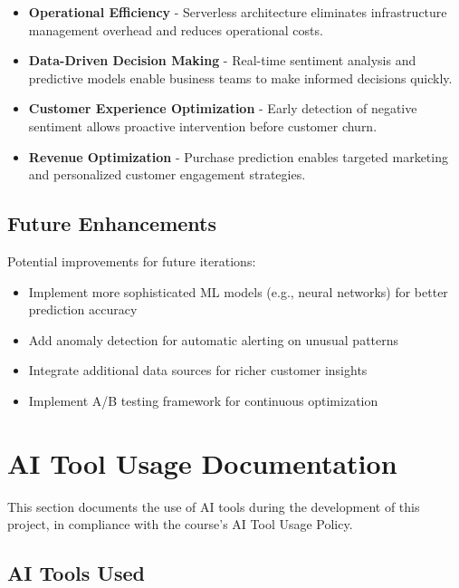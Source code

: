 \documentclass[12pt,a4paper]{article}
\begin{document}
\begin{itemize}
    \item \textbf{Operational Efficiency} - Serverless architecture eliminates infrastructure management overhead and reduces operational costs.
    
    \item \textbf{Data-Driven Decision Making} - Real-time sentiment analysis and predictive models enable business teams to make informed decisions quickly.
    
    \item \textbf{Customer Experience Optimization} - Early detection of negative sentiment allows proactive intervention before customer churn.
    
    \item \textbf{Revenue Optimization} - Purchase prediction enables targeted marketing and personalized customer engagement strategies.
\end{itemize}

\subsection{Future Enhancements}

Potential improvements for future iterations:

\begin{itemize}
    \item Implement more sophisticated ML models (e.g., neural networks) for better prediction accuracy
    \item Add anomaly detection for automatic alerting on unusual patterns
    \item Integrate additional data sources for richer customer insights
    \item Implement A/B testing framework for continuous optimization
\end{itemize}

\section{AI Tool Usage Documentation}

This section documents the use of AI tools during the development of this project, in compliance with the course's AI Tool Usage Policy.

\subsection{AI Tools Used}
\end{document}
